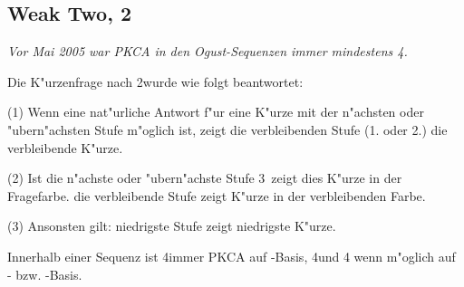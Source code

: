 \begin{appendix}
\subsection*{Weak Two, 2\coe}

\emph{Vor Mai 2005 war PKCA in den Ogust-Sequenzen immer mindestens 4\tre.}

Die K"urzenfrage nach 2\coe wurde wie folgt beantwortet:

(1) Wenn eine nat"urliche Antwort f"ur eine K"urze mit der n"achsten oder
"ubern"achsten Stufe m"oglich ist, zeigt die verbleibenden Stufe (1. oder 2.)
die verbleibende K"urze.

(2) Ist die n"achste oder "ubern"achste Stufe 3\SA\, zeigt dies K"urze in der
Fragefarbe. die verbleibende Stufe zeigt K"urze in der verbleibenden Farbe.

(3) Ansonsten gilt: niedrigste Stufe zeigt niedrigste K"urze.

Innerhalb einer Sequenz ist 4\pik immer PKCA auf \co-Basis, 4\tre und 4\kar
wenn m"oglich auf \tr- bzw. \ka-Basis.


\end{appendix}

